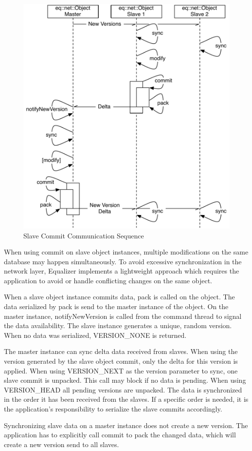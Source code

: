 \documentclass[10pt,a4]{scrartcl}
\begin{document}
\begin{figure}
  \includegraphics[width=.618\textwidth]{images/slaveWrites.pdf}
  {\caption{\label{fSlaveCommit}Slave Commit Communication Sequence}}
\end{figure}
When using \textsf{commit} on slave object instances, multiple modifications on
the same database may happen simultaneously. To avoid excessive synchronization
in the network layer, Equalizer implements a lightweight approach which requires
the application to avoid or handle conflicting changes on the same object.

When a slave object instance commits data, \textsf{pack} is called on the
object. The data serialized by \textsf{pack} is send to the master instance of
the object. On the master instance, \textsf{notifyNewVersion} is called from the
command thread to signal the data availability. The slave instance generates a
unique, random version. When no data was serialized, \textsf{VERSION\_NONE} is
returned.

The master instance can \textsf{sync} delta data received from slaves. When
using the version generated by the slave object commit, only the delta for this
version is applied. When using \textsf{VERSION\_NEXT} as the version parameter
to \textsf{sync}, one slave commit is unpacked. This call may block if no data
is pending. When using \textsf{VERSION\_HEAD} all pending versions are
unpacked. The data is synchronized in the order it has been received from the
slaves. If a specific order is needed, it is the application's responsibility to
serialize the slave commits accordingly.

Synchronizing slave data on a master instance does not create a new version. The
application has to explicitly call \textsf{commit} to pack the changed data,
which will create a new version send to all slaves.
\end{document}

